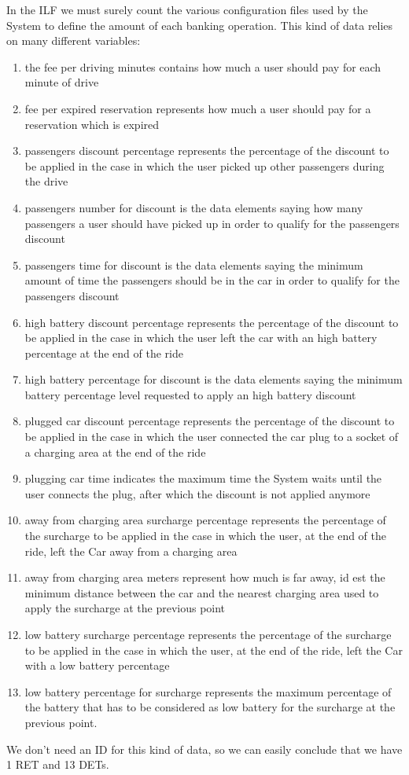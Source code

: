 In the ILF we must surely count the various configuration files used by the System to define the amount of each banking operation. This kind of data relies on many different variables:
\begin{enumerate}
	\item the fee per driving minutes contains how much a user should pay for each minute of drive
	\item fee per expired reservation represents how much a user should pay for a reservation which is expired
	\item passengers discount percentage represents the percentage of the discount to be applied in the case in which the user picked up other passengers during the drive
	\item passengers number for discount is the data elements saying how many passengers a user should have picked up in order to qualify for the passengers discount
	\item passengers time for discount is the data elements saying the minimum amount of time the passengers should be in the car in order to qualify for the passengers discount
	\item high battery discount percentage represents the percentage of the discount to be applied in the case in which the user left the car with an high battery percentage at the end of the ride
	\item high battery percentage for discount  is the data elements saying the minimum battery percentage level requested to apply an high battery discount
	\item plugged car discount percentage represents the percentage of the discount to be applied in the case in which the user connected the car plug to a socket of a charging area at the end of the ride
	\item plugging car time indicates the maximum time the System waits until the user connects the plug, after which the discount is not applied anymore
	\item away from charging area surcharge percentage represents the percentage of the surcharge to be applied in the case in which the user, at the end of the ride, left the Car away from a charging area
	\item away from charging area meters represent how much is far away, id est the minimum distance between the car and the nearest charging area used to apply the surcharge at the previous point
	\item low battery surcharge percentage represents the percentage of the surcharge to be applied in the case in which the user, at the end of the ride, left the Car with a low battery percentage
	\item low battery percentage for surcharge represents the maximum percentage of the battery that has to be considered as low battery for the surcharge at the previous point.
\end{enumerate}
We don't need an ID for this kind of data, so we can easily conclude that we have 1 RET and 13 DETs.
\smallskip

